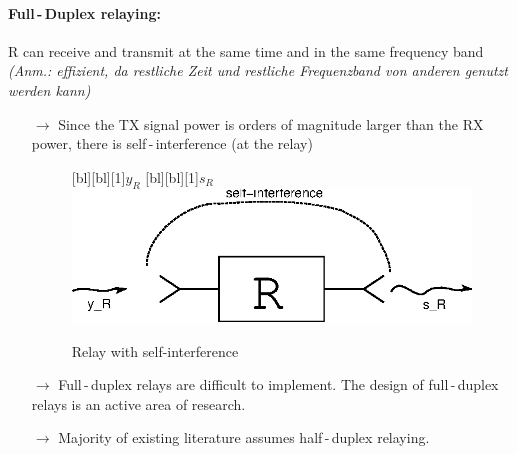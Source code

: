 \documentclass[a4paper, 10pt]{article}
\begin{document}
\paragraph{Full\,-\,Duplex relaying:} 
R can receive and transmit at the same time and in the same frequency band \textit{(Anm.: effizient, da restliche Zeit und restliche Frequenzband von anderen genutzt werden kann)}
\begin{itemize}
	\item[$\rightarrow$] Since the TX signal power is orders of magnitude larger than the RX power, there is self\,-\,interference (at the relay) 
		\begin{figure}[ht]
			\centering
			[bl][bl][1]{$y_{R}$}
			[bl][bl][1]{$s_{R}$}
			\includegraphics[scale=1]{Relay_self_interference}	
			\caption{Relay with self-interference}
			\label{fig:relay_self_interference}
		\end{figure}	
	\item[$\rightarrow$] Full\,-\,duplex relays are difficult to implement. The design of full\,-\,duplex relays is an active area of research.
	\item[$\rightarrow$] Majority of existing literature assumes half\,-\,duplex relaying.
\end{itemize}
\end{document}

